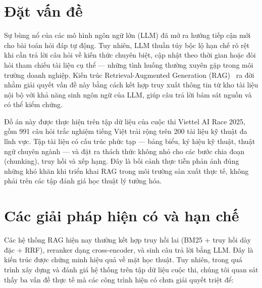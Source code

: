 \documentclass[../DoAn.tex]{subfiles}
\begin{document}
\section{Đặt vấn đề}
\label{section:1.1}

Sự bùng nổ của các mô hình ngôn ngữ lớn (LLM) đã mở ra hướng tiếp cận mới cho bài toán hỏi đáp tự động. Tuy nhiên, LLM thuần túy bộc lộ hạn chế rõ rệt khi cần trả lời câu hỏi về kiến thức chuyên biệt, cập nhật theo thời gian hoặc đòi hỏi tham chiếu tài liệu cụ thể --- những tình huống thường xuyên gặp trong môi trường doanh nghiệp. Kiến trúc Retrieval-Augmented Generation (RAG)~\cite{lewis2020rag} ra đời nhằm giải quyết vấn đề này bằng cách kết hợp truy xuất thông tin từ kho tài liệu nội bộ với khả năng sinh ngôn ngữ của LLM, giúp câu trả lời bám sát nguồn và có thể kiểm chứng.

Đồ án này được thực hiện trên tập dữ liệu của cuộc thi Viettel AI Race 2025, gồm 991 câu hỏi trắc nghiệm tiếng Việt trải rộng trên 200 tài liệu kỹ thuật đa lĩnh vực. Tập tài liệu có cấu trúc phức tạp --- bảng biểu, ký hiệu kỹ thuật, thuật ngữ chuyên ngành --- và đặt ra thách thức không nhỏ cho các bước chia đoạn (chunking), truy hồi và xếp hạng. Đây là bối cảnh thực tiễn phản ánh đúng những khó khăn khi triển khai RAG trong môi trường sản xuất thực tế, không phải trên các tập đánh giá học thuật lý tưởng hóa.

\section{Các giải pháp hiện có và hạn chế}
\label{section:1.2}

Các hệ thống RAG hiện nay thường kết hợp truy hồi lai (BM25 + truy hồi dày đặc + RRF), reranker dạng cross-encoder, và sinh câu trả lời bằng LLM. Đây là kiến trúc được chứng minh hiệu quả về mặt học thuật. Tuy nhiên, trong quá trình xây dựng và đánh giá hệ thống trên tập dữ liệu cuộc thi, chúng tôi quan sát thấy ba vấn đề thực tế mà các công trình hiện có chưa giải quyết triệt để:
\end{document}
